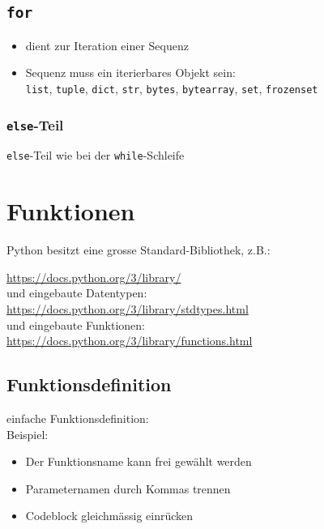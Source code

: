 \subsection{\texttt{for}}

\begin{itemize}
	\item dient zur Iteration einer Sequenz
	\item Sequenz muss ein iterierbares Objekt sein:\\
	\texttt{list}, \texttt{tuple}, \texttt{dict}, \texttt{str}, \texttt{bytes}, \texttt{bytearray}, \texttt{set}, \texttt{frozenset}
\end{itemize}

\subsubsection{\texttt{else}-Teil}

\texttt{else}-Teil wie bei der \texttt{while}-Schleife

\section{Funktionen}
Python besitzt eine grosse Standard-Bibliothek, z.B.:

\url{https://docs.python.org/3/library/}\\

und eingebaute Datentypen:\\
\url{https://docs.python.org/3/library/stdtypes.html}\\

und eingebaute Funktionen:\\
\url{https://docs.python.org/3/library/functions.html}

\subsection{Funktionsdefinition}
einfache Funktionsdefinition:\\


Beispiel:\\


\begin{itemize}
	\item Der Funktionsname kann frei gewählt werden
	\item Parameternamen durch Kommas trennen
	\item Codeblock gleichmässig einrücken
\end{itemize}

